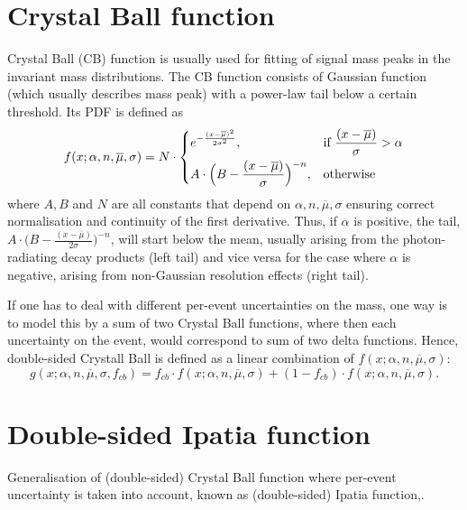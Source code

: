 \label{sec:PDFS}
\section{Crystal Ball function}
\label{CB}
Crystal Ball (\Gls{CB}) function \cite{Skwarnicki:1986xj}
is usually used for fitting of signal mass peaks in the invariant mass distributions. The \gls{CB} function consists of Gaussian function (which usually describes mass peak) with a power-law tail below a certain threshold. Its PDF is defined as
\begin{equation}
  f(x; \alpha,n,\overline{\mu},\sigma) = N \cdot
  \begin{dcases}
    e^{-\frac{(x-\overline{\mu})^{2}}{2\sigma^{2}}},& \text{if } \frac{(x-\overline{\mu})}{\sigma}  >\alpha\\
    A \cdot\Big(B - \frac{(x-\overline{\mu})}{\sigma}\Big)^{-n}, & \text{otherwise}
  \end{dcases}
  \label{Eq:CB}
\end{equation}
where $A, B$ and $N$ are all constants that depend on ${\alpha,n,\overline{\mu},\sigma}$ ensuring correct normalisation and continuity of the first derivative. Thus, if $\alpha$ is positive, the tail, $A\cdot \Big(B - \frac{(x-\overline{\mu})}{2\sigma}\Big)^{-n}$, will start below the mean, usually arising from the photon-radiating decay products (left tail) and vice versa for the case where $\alpha$ is negative, arising from non-Gaussian resolution effects (right tail).

If one has to deal with different per-event uncertainties on the mass, one way is to model this by a sum of two Crystal Ball functions, where then each uncertainty on the event, would correspond to sum of two delta functions. Hence, double-sided Crystall Ball is defined as a linear combination of $f(x; \alpha,n,\overline{\mu},\sigma)$:
\begin{equation}
	g(x; \alpha,n,\overline{\mu},\sigma, f_{cb}) = f_{cb} \cdot f(x; \alpha,n,\overline{\mu},\sigma) + (1-f_{cb})\cdot f(x; \alpha,n,\overline{\mu},\sigma).
\end{equation}


\section{Double-sided Ipatia function}
\label{IP}
Generalisation of (double-sided) Crystal Ball function where per-event uncertainty is taken into account, known as (double-sided) Ipatia function,\cite{Santos:2013gra}. 

